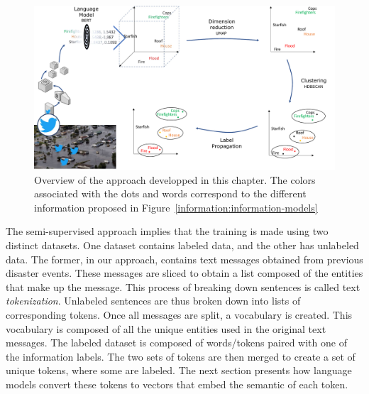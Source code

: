 \begin{figure}[htb]
    \centering
    \includegraphics[width=\textwidth]{figures/chap-4/big-picture.pdf}
    \caption{Overview of the approach developped in this chapter. The colors associated with the dots and words correspond to the different information proposed in Figure~\ref{information:information-models}}
    \label{processing:big-picture}
\end{figure}

The semi-supervised approach implies that the training is made using two distinct datasets.
One dataset contains labeled data, and the other has unlabeled data.
The former, in our approach, contains text messages obtained from previous disaster events.
These messages are sliced to obtain a list composed of the entities that make up the message.
This process of breaking down sentences is called text \emph{tokenization}.
Unlabeled sentences are thus broken down into lists of corresponding tokens.
Once all messages are split, a vocabulary is created.
This vocabulary is composed of all the unique entities used in the original text messages.
The labeled dataset is composed of words/tokens paired with one of the information labels.
The two sets of tokens are then merged to create a set of unique tokens, where some are labeled.
The next section presents how language models convert these tokens to vectors that embed the semantic of each token.

